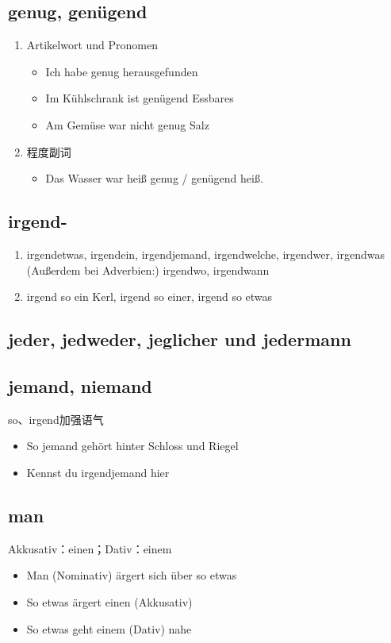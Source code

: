 \documentclass[UTF8]{report}
\begin{document}
\subsection{genug, genügend}
\begin{enumerate}
    \item Artikelwort und Pronomen
    \begin{itemize}
        \item Ich habe genug herausgefunden
        \item Im Kühlschrank ist genügend Essbares
        \item Am Gemüse war nicht genug Salz
    \end{itemize}
    \item 程度副词
    \begin{itemize}
        \item Das Wasser war heiß genug / genügend heiß.
    \end{itemize}
\end{enumerate}

\subsection{irgend-}
\begin{enumerate}
    \item irgendetwas, irgendein, irgendjemand, irgendwelche, irgendwer, irgendwas (Außerdem bei Adverbien:) irgendwo, irgendwann
    \item irgend so ein Kerl, irgend so einer, irgend so etwas
\end{enumerate}


\subsection{jeder, jedweder, jeglicher und jedermann}

\subsection{jemand, niemand}
so、irgend加强语气
\begin{itemize}
    \item So jemand gehört hinter Schloss und Riegel
    \item Kennst du irgendjemand hier
\end{itemize}

\subsection{man}
Akkusativ：einen；Dativ：einem
\begin{itemize}
    \item Man (Nominativ) ärgert sich über so etwas
    \item So etwas ärgert einen (Akkusativ)
    \item So etwas geht einem (Dativ) nahe
\end{itemize}
\end{document}
